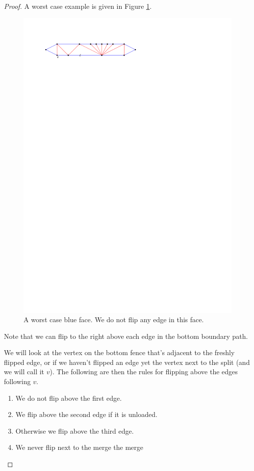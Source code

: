   \begin{proof}
  A worst case example is given in Figure \ref{fig:subdiv:worstCase}.

  \begin{figure}[h]
    \centering
    \includegraphics[scale=1]{blueFaceSubdivision/img/worstCase}
    \caption{A worst case blue face. We do not flip any edge in this face.}
    \label{fig:subdiv:worstCase}
  \end{figure}

  Note that we can flip to the right above each edge in the bottom boundary path.

  We will look at the vertex on the bottom fence that's adjacent to the freshly flipped edge, or if we haven't flipped an edge yet the vertex next to the split (and we will call it $v$). The following are then the rules for flipping above the edges following $v$.
  \begin{enumerate}
    \item We do not flip above the first edge.
    \item We flip above the second edge if it is unloaded.
    \item Otherwise we flip above the third edge.
    \item We never flip next to the merge the merge
  \end{enumerate}


\end{proof}
